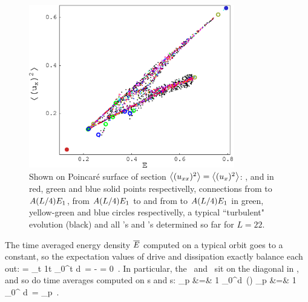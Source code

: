 \begin{figure}[t] \label{f:drivedragPoinc}
\begin{center}
    \includegraphics[width=0.8\textwidth]{figs/energyPoinc.eps}
\end{center}
\caption{
Shown on Poincar\'{e} surface of section $\left\langle {(u_{xx})^2} \right\rangle = \left\langle {(u_{x})^2} \right\rangle$:
,  and  in red, green and blue solid points respectivelly,
connections from  to $A(L/4)E_{1}$,
from $A(L/4)E_{1}$ to  and from  to $A(L/4)E_{1}$ in green, yellow-green and blue circles respectivelly,
a typical ``turbulent" evolution (black) and all \po's and \rpo's determined so far for $L=22$.
        }
\end{figure}


The time averaged energy density  $\overline{E}$
computed on a typical orbit goes to a constant, so
the expectation values  of drive and dissipation
exactly balance each out:
\beq
      =
    \lim_{t\rightarrow \infty}
        {1\over t} \int_0^t d\tau \, \dot{\expctE}
=
       - 
= 0
    \,.
In particular, the \eqva\
and \reqva\ sit on the diagonal in ,
and so do time averages computed on \po s and \rpo s:
\bea
{}_p &=&
{1\over {}} \int_0^d\tau \, \expctE(\tau)
    \continue
{}_p &=&
{1\over {}} \int_0^ d\tau \, 
    =
      _p
    \,.
\label{poE}
\eea

